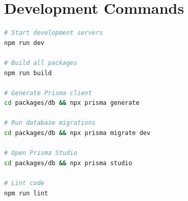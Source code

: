 \documentclass[12pt,a4paper]{report}
\begin{document}
\section{Development Commands}

\begin{lstlisting}[language=bash, caption=Common Development Commands]
# Start development servers
npm run dev

# Build all packages
npm run build

# Generate Prisma client
cd packages/db && npx prisma generate

# Run database migrations
cd packages/db && npx prisma migrate dev

# Open Prisma Studio
cd packages/db && npx prisma studio

# Lint code
npm run lint
\end{lstlisting}
\end{document}
